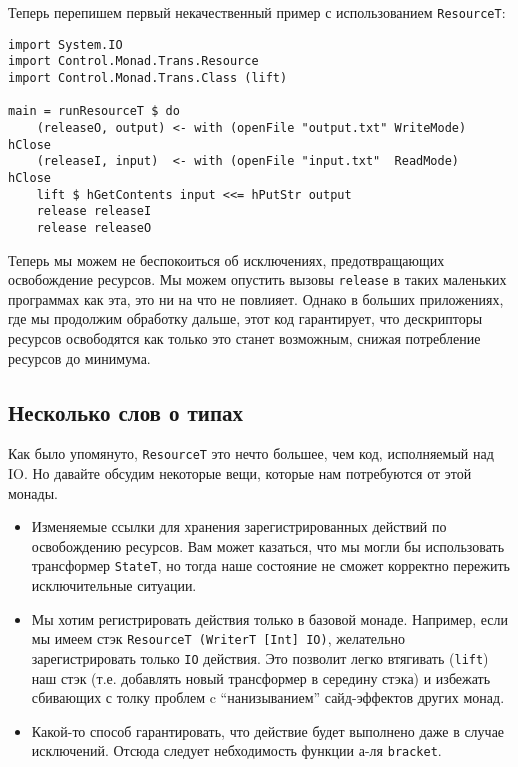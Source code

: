 Теперь перепишем первый некачественный пример с использованием \lstinline'ResourceT':
\begin{lstlisting}
import System.IO
import Control.Monad.Trans.Resource
import Control.Monad.Trans.Class (lift)

main = runResourceT $ do
    (releaseO, output) <- with (openFile "output.txt" WriteMode) hClose
    (releaseI, input)  <- with (openFile "input.txt"  ReadMode)  hClose
    lift $ hGetContents input <<= hPutStr output
    release releaseI
    release releaseO
\end{lstlisting}

Теперь мы можем не беспокоиться об исключениях, предотвращающих освобождение ресурсов. Мы
можем опустить вызовы \verb=release= в таких маленьких программах как эта, это ни на что
не повлияет. Однако в больших приложениях, где мы продолжим обработку дальше, этот код
гарантирует, что дескрипторы ресурсов освободятся как только это станет возможным, снижая
потребление ресурсов до минимума.

\subsection{Несколько слов о типах}

Как было упомянуто, \lstinline'ResourceT' это нечто большее, чем код, исполняемый над IO.
Но давайте обсудим некоторые вещи, которые нам потребуются от этой монады.
\begin{itemize}
\item Изменяемые ссылки для хранения зарегистрированных действий по освобождению
ресурсов. Вам может казаться, что мы могли бы использовать трансформер \lstinline'StateT',
но тогда наше состояние не сможет корректно пережить исключительные ситуации.

\item Мы хотим регистрировать действия только в базовой монаде. Например, если мы имеем 
стэк \lstinline'ResourceT (WriterT [Int] IO)', желательно зарегистрировать
только \verb'IO' действия. Это позволит легко втягивать (\verb'lift') наш стэк (т.е. добавлять новый
трансформер в середину стэка) и избежать сбивающих с толку проблем c ``нанизыванием'' сайд-эффектов других монад.


\item Какой-то способ гарантировать, что действие будет выполнено даже в случае
исключений. Отсюда следует небходимость функции а-ля \verb'bracket'.
\end{itemize}

